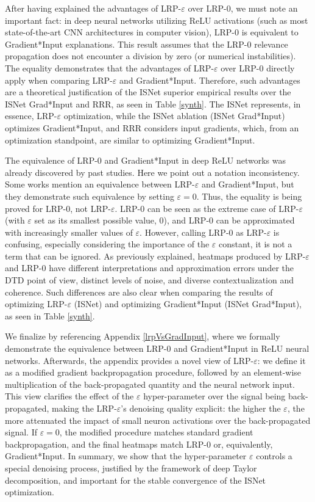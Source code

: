 \documentclass[fleqn,10pt]{wlscirep}
\begin{document}
{After having explained the advantages of LRP-$\varepsilon$ over LRP-0, we must note an important fact: in deep neural networks utilizing ReLU activations (such as most state-of-the-art CNN architectures in computer vision), LRP-0 is equivalent to Gradient*Input explanations. This result assumes that the LRP-0 relevance propagation does not encounter a division by zero (or numerical instabilities). The equality demonstrates that the advantages of LRP-$\varepsilon$ over LRP-0 directly apply when comparing LRP-$\varepsilon$ and Gradient*Input. Therefore, such advantages are a theoretical justification of the ISNet superior empirical results over the ISNet Grad*Input and RRR, as seen in Table \ref{synth}. The ISNet represents, in essence, LRP-$\varepsilon$ optimization, while the ISNet ablation (ISNet Grad*Input) optimizes Gradient*Input, and RRR considers input gradients, which, from an optimization standpoint, are similar to optimizing Gradient*Input.

The equivalence of LRP-0 and Gradient*Input in deep ReLU networks was already discovered by past studies\cite{LRPvsGrad}. Here we point out a notation inconsistency. Some works mention an equivalence between LRP-$\varepsilon$ and Gradient*Input, but they demonstrate such equivalence by setting $\varepsilon=0$. Thus, the equality is being proved for LRP-0, not LRP-$\varepsilon$. LRP-0 can be seen as the extreme case of LRP-$\varepsilon$ (with $\varepsilon$ set as its smallest possible value, 0), and LRP-0 can be approximated with increasingly smaller values of $\varepsilon$. However, calling LRP-0 as LRP-$\varepsilon$ is confusing, especially considering the importance of the $\varepsilon$ constant, it is not a term that can be ignored. As previously explained, heatmaps produced by LRP-$\varepsilon$ and LRP-0 have different interpretations and approximation errors under the DTD point of view, distinct levels of noise, and diverse contextualization and coherence. Such differences are also clear when comparing the results of optimizing LRP-$\varepsilon$ (ISNet) and optimizing Gradient*Input (ISNet Grad*Input), as seen in Table \ref{synth}.

We finalize by referencing Appendix \ref{lrpVsGradInput}, where we formally demonstrate the equivalence between LRP-0 and Gradient*Input in ReLU neural networks. Afterwards, the appendix provides a novel view of LRP-$\varepsilon$: we define it as a modified gradient backpropagation procedure, followed by an element-wise multiplication of the back-propagated quantity and the neural network input. This view clarifies the effect of the $\varepsilon$ hyper-parameter over the signal being back-propagated, making the LRP-$\varepsilon$'s denoising quality explicit: the higher the $\varepsilon$, the more attenuated the impact of small neuron activations over the back-propagated signal. If $\varepsilon=0$, the modified procedure matches standard gradient backpropagation, and the final heatmaps match LRP-0 or, equivalently, Gradient*Input. In summary, we show that the hyper-parameter $\varepsilon$ controls a special denoising process, justified by the framework of deep Taylor decomposition, and important for the stable convergence of the ISNet optimization.



}
\end{document}

